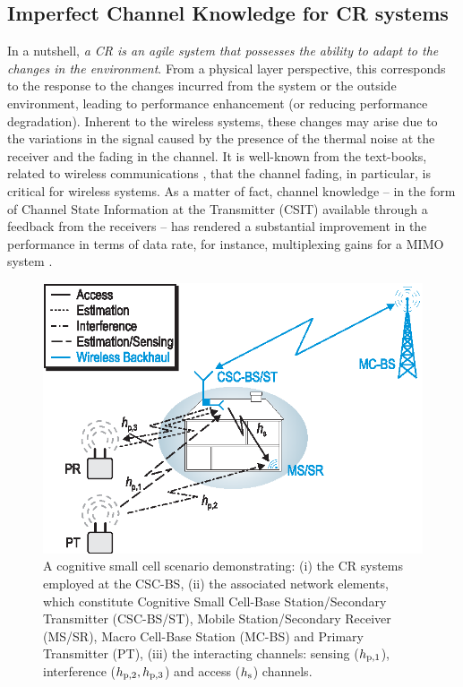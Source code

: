 \subsection{Imperfect Channel Knowledge for CR systems}

In a nutshell, \textit{a CR is an agile system that possesses the ability to adapt to the changes in the environment}. From a physical layer perspective, this corresponds to the response to the changes incurred from the system or the outside environment, leading to performance enhancement (or reducing performance degradation). Inherent to the wireless systems, these changes may arise due to the variations in the signal caused by the presence of the thermal noise at the receiver and the fading in the channel. It is well-known from the text-books, related to wireless communications \cite{simon2005, Goldsmith05, Tse05}, that the channel fading, in particular, is critical for wireless systems. As a matter of fact, channel knowledge -- in the form of Channel State Information at the Transmitter (CSIT) available through a feedback from the receivers -- has rendered a substantial improvement in the performance in terms of data rate, for instance, multiplexing gains for a MIMO system \cite{Ali12}. 


\begin{figure}[!t]
\centering
\includegraphics[width = \figscalet]{figures/CR_Scenario_Hybrid}
\caption{A cognitive small cell scenario demonstrating: (i) the CR systems employed at the CSC-BS, (ii) the associated network elements, which constitute Cognitive Small Cell-Base Station/Secondary Transmitter (CSC-BS/ST), Mobile Station/Secondary Receiver (MS/SR), Macro Cell-Base Station (MC-BS) and Primary Transmitter (PT), (iii) the interacting channels: sensing ($h_{\text{p,1}}$), interference ($h_{\text{p,2}}, h_{\text{p,3}}$) and access ($h_{\text{s}}$) channels.}
\label{fig_Int:scenario}
\end{figure}


